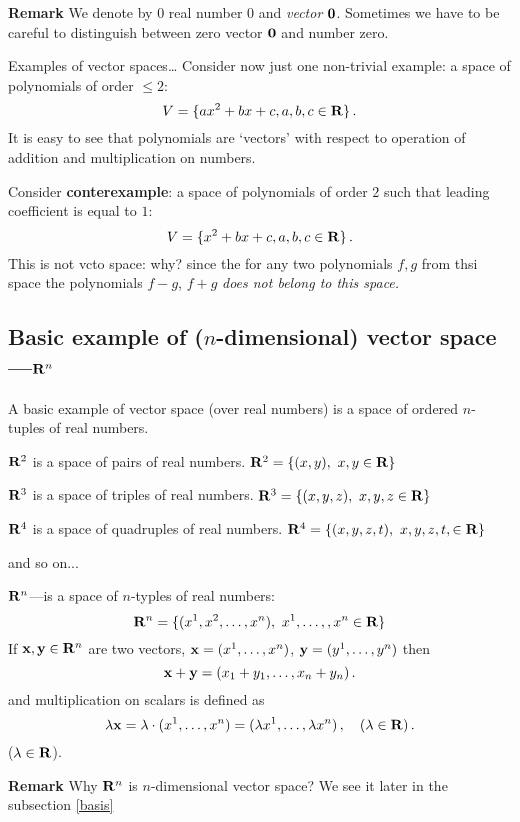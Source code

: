 \documentclass[12pt]{article}
\numberwithin{equation}{section}
\begin{document}
\smallskip

{\bf Remark} We denote by $0$ real number  $0$ and {\it vector }
$\bf 0$. Sometimes we have to be careful to distinguish
between zero  vector $\bf 0$ and number zero.

\smallskip

 Examples of vector spaces\ldots
 Consider now just one non-trivial example:
a space of polynomials of order $\leq 2$:
            $$
   V=\{ax^2+bx+c, a,b,c\in {\bf R}\}\,.
            $$
It is easy to see that polynomials are `vectors' with respect to 
operation of addition and multiplication on numbers.

 Consider {\bf conterexample}: 
a space of polynomials of order $2$ such that leading coefficient 
is equal to $1$:
            $$
   V=\{x^2+bx+c, a,b,c\in {\bf R}\}\,.
            $$
This is not vcto space: why? since the for any two polynomials $f,g$ from
thsi space the polynomials $f-g$, $f+g$ 
{\it does not belong to this space.}

\subsection {Basic example of ($n$-dimensional) vector space---${\bf R}^n$}

 A basic example of vector space (over real numbers) is a space
  of ordered $n$-tuples of real numbers.


\noindent  ${\bf R}^2$ is a space of pairs of real numbers. ${\bf R}^2=\{(x,y),\,\,x,y\in {\bf R} \}$

\noindent    ${\bf R}^3$ is a space of triples  of real numbers. ${\bf R}^3=\{(x,y,z),\,\,x,y,z\in {\bf R} \}$

\noindent    ${\bf R}^4$ is a space of quadruples  of real numbers. ${\bf R}^4=\{(x,y,z,t),\,\,x,y,z,t,\in {\bf R} \}$

  \centerline {and so on...}
  ${\bf R}^n$---is a space of $n$-typles of real numbers:
                    \begin{equation}\label{basisexampleofvectorspace}
         {\bf R}^n=\{(x^1,x^2,\dots,x^n),\,\,x^1,\dots,,x^n\in {\bf R} \}
                     \end{equation}
  If  ${\bf x},{\bf y}\in {\bf R}^n$ are two vectors, ${\bf x}=(x^1,\dots,x^n)$, ${\bf y}=(y^1,\dots,y^n)$
then             $$
        {\bf x}+{\bf y}=(x_1+y_1,\dots,x_n+y_n)\,.
                 $$ and
multiplication on scalars is defined as
           $$
\lambda{\bf x}=\lambda \cdot (x^1,\dots,x^n)=(\lambda x^1,\dots,\lambda x^n)\,,\quad (\lambda\in {\bf R})\,.
           $$
($\lambda\in {\bf R}$).

\m
{\bf Remark}  Why ${\bf R}^n$ is 
$n$-dimensional vector space? We see it later in the subsection \ref{basis}
\end{document}
